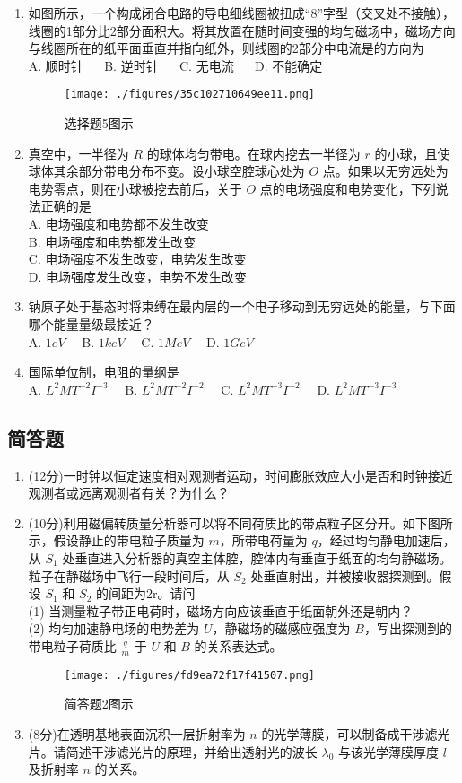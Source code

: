 \begin{enumerate}
\item 如图所示，一个构成闭合电路的导电细线圈被扭成“8”字型（交叉处不接触），线圈的1部分比2部分面积大。将其放置在随时间变强的均匀磁场中，磁场方向与线圈所在的纸平面垂直并指向纸外，则线圈的2部分中电流是的方向为\\
A. 顺时针 $\quad$
B. 逆时针 $\quad$
C. 无电流 $\quad$
D. 不能确定 $\quad$
\begin{figure}[ht]
\centering
\texttt{[image: ./figures/35c102710649ee11.png]}
\caption{选择题5图示} \label{fig_CAS17_2}
\end{figure}
\item 真空中，一半径为 $R$ 的球体均匀带电。在球内挖去一半径为 $r$ 的小球，且使球体其余部分带电分布不变。设小球空腔球心处为 $O$ 点。如果以无穷远处为电势零点，则在小球被挖去前后，关于 $O$ 点的电场强度和电势变化，下列说法正确的是\\
A. 电场强度和电势都不发生改变 \\
B. 电场强度和电势都发生改变 \\
C. 电场强度不发生改变，电势发生改变 \\
D. 电场强度发生改变，电势不发生改变 \\
\item 钠原子处于基态时将束缚在最内层的一个电子移动到无穷远处的能量，与下面哪个能量量级最接近？\\
A. $1eV\quad$
B. $1keV\quad$
C. $1MeV\quad$
D. $1GeV\quad$
\item 国际单位制，电阻的量纲是\\
A. $L^{2}MT^{-2}I^{-3}\quad$
B. $L^{2}MT^{-2}I^{-2}\quad$
C. $L^{2}MT^{-3}I^{-2}\quad$
D. $L^{2}MT^{-3}I^{-3}\quad$
\end{enumerate}
\subsection{简答题}
\begin{enumerate}
\item (12分)一时钟以恒定速度相对观测者运动，时间膨胀效应大小是否和时钟接近观测者或远离观测者有关？为什么？
\item (10分)利用磁偏转质量分析器可以将不同荷质比的带点粒子区分开。如下图所示，假设静止的带电粒子质量为 $m$，所带电荷量为 $q$，经过均匀静电加速后，从 $S_{1}$ 处垂直进入分析器的真空主体腔，腔体内有垂直于纸面的均匀静磁场。粒子在静磁场中飞行一段时间后，从 $S_{2}$ 处垂直射出，并被接收器探测到。假设 $S_{1}$ 和 $S_{2}$ 的间距为2r。请问\\
(1) 当测量粒子带正电荷时，磁场方向应该垂直于纸面朝外还是朝内？\\
(2) 均匀加速静电场的电势差为 $U$，静磁场的磁感应强度为 $B$，写出探测到的带电粒子荷质比 $\frac{q}{m}$ 于 $U$ 和 $B$ 的关系表达式。\\
\begin{figure}[ht]
\centering
\texttt{[image: ./figures/fd9ea72f17f41507.png]}
\caption{简答题2图示} \label{fig_CAS17_3}
\end{figure}
\item (8分)在透明基地表面沉积一层折射率为 $n$ 的光学薄膜，可以制备成干涉滤光片。请简述干涉滤光片的原理，并给出透射光的波长 $\lambda_{0}$ 与该光学薄膜厚度 $l$ 及折射率 $n$ 的关系。
\end{enumerate}
